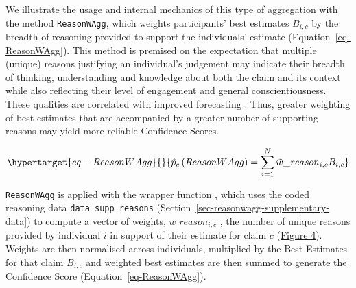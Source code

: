 \documentclass[article]{jss}
\newcommand{\fct}[1]{\code{#1()}}
\begin{document}
We illustrate the usage and internal mechanics of this type of
aggregation with the method \texttt{ReasonWAgg}, which weights
participants' best estimates \(B_{i,c}\) by the breadth of reasoning
provided to support the individuals' estimate
(Equation~\ref{eq-ReasonWAgg}). This method is premised on the
expectation that multiple (unique) reasons justifying an individual's
judgement may indicate their breadth of thinking, understanding and
knowledge about both the claim and its context \citep{Hanea2021} while
also reflecting their level of engagement and general conscientiousness.
These qualities are correlated with improved forecasting
\citep{Wintle:2021}. Thus, greater weighting of best estimates that are
accompanied by a greater number of supporting reasons may yield more
reliable Confidence Scores.

\begin{equation}\protect\hypertarget{eq-ReasonWAgg}{}{
\hat{p}_c\left( ReasonWAgg \right) = \sum_{i=1}^N \tilde{w}\_reason_{i,c}B_{i,c}
}\label{eq-ReasonWAgg}\end{equation}

\texttt{ReasonWAgg} is applied with the wrapper function
\fct{ReasoningWAgg}, which uses the coded reasoning data
\texttt{data\_supp\_reasons}
(Section~\ref{sec-reasonwagg-supplementary-data}) to compute a vector of
weights, \(w\_reason_{i,c}\) , the number of unique reasons provided by
individual \(i\) in support of their estimate for claim \(c\)
(\protect\hyperlink{fig-ReasonWAgg}{Figure 4}). Weights are then
normalised across individuals, multiplied by the Best Estimates for that
claim \(B_{i,c}\) and weighted best estimates are then summed to
generate the Confidence Score (Equation~\ref{eq-ReasonWAgg}).
\end{document}
